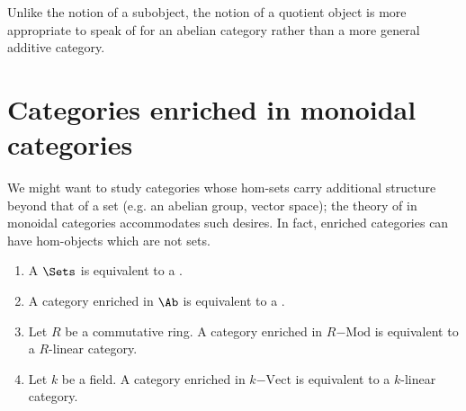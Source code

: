 

Unlike the notion of a subobject, the notion of a quotient object is more appropriate to speak of for an abelian category rather than a more general additive category.













\section{Categories enriched in monoidal categories}


We might want to study categories whose hom-sets carry additional structure beyond that of a set (e.g. an abelian group, vector space); the theory of  in monoidal categories accommodates such desires. In fact, enriched categories can have hom-objects which are not sets.



\begin{example}
    \begin{enumerate}
        \item A  $\Sets$ is equivalent to a . 
        \item A category enriched in $\Ab$ is equivalent to a . 
        \item Let $R$ be a commutative ring. A category enriched in $R\mathrm{-Mod}$ is equivalent to a $R$-linear category. 
        \item Let $k$ be a field. A category enriched in $k\mathrm{-Vect}$ is equivalent to a $k$-linear category. 
    \end{enumerate}
\end{example}



